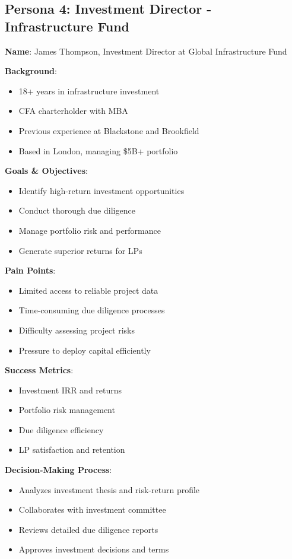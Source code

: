 \documentclass[business]{../templates/infraradar-main}
\begin{document}
\subsection{Persona 4: Investment Director - Infrastructure Fund}
\textbf{Name}: James Thompson, Investment Director at Global Infrastructure Fund

\textbf{Background}:
\begin{itemize}
    \item 18+ years in infrastructure investment
    \item CFA charterholder with MBA
    \item Previous experience at Blackstone and Brookfield
    \item Based in London, managing \$5B+ portfolio
\end{itemize}

\textbf{Goals \& Objectives}:
\begin{itemize}
    \item Identify high-return investment opportunities
    \item Conduct thorough due diligence
    \item Manage portfolio risk and performance
    \item Generate superior returns for LPs
\end{itemize}

\textbf{Pain Points}:
\begin{itemize}
    \item Limited access to reliable project data
    \item Time-consuming due diligence processes
    \item Difficulty assessing project risks
    \item Pressure to deploy capital efficiently
\end{itemize}

\textbf{Success Metrics}:
\begin{itemize}
    \item Investment IRR and returns
    \item Portfolio risk management
    \item Due diligence efficiency
    \item LP satisfaction and retention
\end{itemize}

\textbf{Decision-Making Process}:
\begin{itemize}
    \item Analyzes investment thesis and risk-return profile
    \item Collaborates with investment committee
    \item Reviews detailed due diligence reports
    \item Approves investment decisions and terms
\end{itemize}
\end{document}
